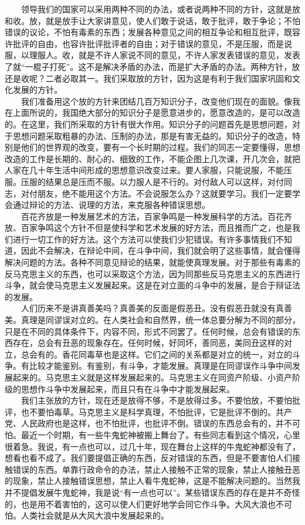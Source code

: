\documentclass[cn,11pt,chinese]{elegantbook}
\begin{document}
　　领导我们的国家可以采用两种不同的办法，或者说两种不同的方针，这就是放和收。放，就是放手让大家讲意见，使人们敢于说话，敢于批评，敢于争论；不怕错误的议论，不怕有毒素的东西；发展各种意见之间的相互争论和相互批评，既容许批评的自由，也容许批评批评者的自由；对于错误的意见，不是压服，而是说服，以理服人。收，就是不许人家说不同的意见，不许人家发表错误的意见，发表了就“一棍子打死”。这不是解决矛盾的办法，而是扩大矛盾的办法。两种方针，放还是收呢？二者必取其一。我们采取放的方针，因为这是有利于我们国家巩固和文化发展的方针。\\
　　我们准备用这个放的方针来团结几百万知识分子，改变他们现在的面貌。像我在上面所说的，我国绝大部分的知识分子是愿意进步的，愿意改造的，是可以改造的。在这里，我们所采取的方针有很大作用。知识分子的问题首先是思想问题，对于思想问题采取粗暴的办法、压制的办法，那是有害无益的。知识分子的改造，特别是他们的世界观的改变，要有一个长时期的过程。我们的同志一定要懂得，思想改造的工作是长期的、耐心的、细致的工作，不能企图上几次课，开几次会，就把人家在几十年生活中间形成的思想意识改变过来。要人家服，只能说服，不能压服。压服的结果总是压而不服。以力服人是不行的。对付敌人可以这样，对付同志，对付朋友，绝不能用这个方法。不会说服怎么办？这就要学习。我们一定要学会通过辩论的方法、说理的方法，来克服各种错误思想。\\
　　百花齐放是一种发展艺术的方法，百家争鸣是一种发展科学的方法。百花齐放、百家争鸣这个方针不但是使科学和艺术发展的好方法，而且推而广之，也是我们进行一切工作的好方法。这个方法可以使我们少犯错误。有许多事情我们不知道，因此不会解决，在辩论中间，在斗争中间，我们就会明了这些事情，就会懂得解决问题的方法。各种不同意见辩论的结果，就能使真理发展。对于那些有毒素的反马克思主义的东西，也可以采取这个方法，因为同那些反马克思主义的东西进行斗争，就会使马克思主义发展起来。这是在对立面的斗争中的发展，是合于辩证法的发展。\\
　　人们历来不是讲真善美吗？真善美的反面是假恶丑。没有假恶丑就没有真善美。真理是同谬误对立的。在人类社会和自然界，统一体总要分解为不同的部分，只是在不同的具体条件下，内容不同，形式不同罢了。任何时候，总会有错误的东西存在，总会有丑恶的现象存在。任何时候，好同坏，善同恶，美同丑这样的对立，总会有的。香花同毒草也是这样。它们之间的关系都是对立的统一，对立的斗争。有比较才能鉴别。有鉴别，有斗争，才能发展。真理是在同谬误作斗争中间发展起来的。马克思主义就是这样发展起来的。马克思主义在同资产阶级、小资产阶级的思想作斗争中发展起来，而且只有在斗争中才能发展起来。\\
　　我们主张放的方针，现在还是放得不够，不是放得过多。不要怕放，不要怕批评，也不要怕毒草。马克思主义是科学真理，不怕批评，它是批评不倒的。共产党、人民政府也是这样，也不怕批评，也批评不倒。错误的东西总会有的，并不可怕。最近一个时期，有一些牛鬼蛇神被搬上舞台了。有些同志看到这个情况，心里很着急。我说，有一点也可以，过几十年，现在舞台上这样的牛鬼蛇神都没有了，想看也看不成了。我们要提倡正确的东西，反对错误的东西，但是不要害怕人们接触错误的东西。单靠行政命令的办法，禁止人接触不正常的现象，禁止人接触丑恶的现象，禁止人接触错误思想，禁止人看牛鬼蛇神，这是不能解决问题的。当然我并不提倡发展牛鬼蛇神，我是说“有一点也可以”。某些错误东西的存在是并不奇怪的，也是用不着害怕的，这可以使人们更好地学会同它作斗争。大风大浪也不可怕。人类社会就是从大风大浪中发展起来的。\\
\end{document}
